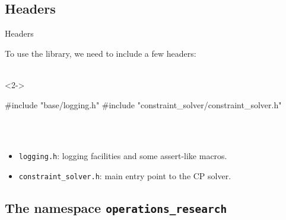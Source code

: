 \documentclass[utf8x,xcolor=dvipsnames]{beamer}
\newcommand{\code}[1]{\texttt{#1}}
\begin{document}
\subsection{Headers}

\begin{frame}[fragile]{Headers}
 
To use the library, we need to include a few headers:\\
~\\
\begin{uncoverenv}<2->
\begin{mycode}
#include "base/logging.h"
#include "constraint_solver/constraint_solver.h"
\end{mycode}
\end{uncoverenv}
~\\
~\\
\begin{itemize}
 \item<3-> \code{logging.h}: logging facilities and some assert-like macros.
 \item<4-> \code{constraint\_solver.h}: main entry point to the CP solver.

 
\end{itemize}

\end{frame}


\subsection{The namespace \texttt{operations\_research}}
\end{document}
